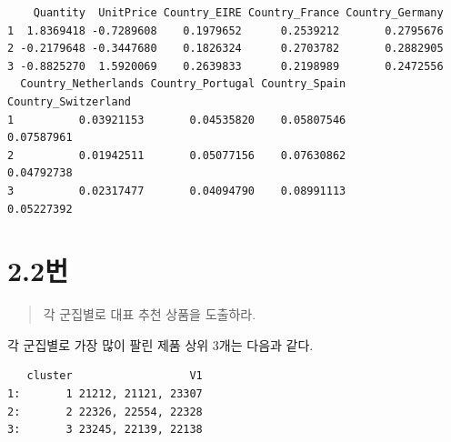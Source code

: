 \documentclass[
  letterpaper,
  DIV=11,
  numbers=noendperiod]{scrreprt}
\newenvironment{Shaded}{\begin{snugshade}}{\end{snugshade}}
\newcommand{\AttributeTok}[1]{\textcolor[rgb]{0.40,0.45,0.13}{#1}}
\newcommand{\DecValTok}[1]{\textcolor[rgb]{0.68,0.00,0.00}{#1}}
\newcommand{\FunctionTok}[1]{\textcolor[rgb]{0.28,0.35,0.67}{#1}}
\newcommand{\NormalTok}[1]{\textcolor[rgb]{0.00,0.23,0.31}{#1}}
\newcommand{\OtherTok}[1]{\textcolor[rgb]{0.00,0.23,0.31}{#1}}
\newcommand{\SpecialCharTok}[1]{\textcolor[rgb]{0.37,0.37,0.37}{#1}}
\begin{document}
\begin{Shaded}
\end{Shaded}

\begin{verbatim}
    Quantity  UnitPrice Country_EIRE Country_France Country_Germany
1  1.8369418 -0.7289608    0.1979652      0.2539212       0.2795676
2 -0.2179648 -0.3447680    0.1826324      0.2703782       0.2882905
3 -0.8825270  1.5920069    0.2639833      0.2198989       0.2472556
  Country_Netherlands Country_Portugal Country_Spain Country_Switzerland
1          0.03921153       0.04535820    0.05807546          0.07587961
2          0.01942511       0.05077156    0.07630862          0.04792738
3          0.02317477       0.04094790    0.08991113          0.05227392
\end{verbatim}

\hypertarget{uxbc88-23}{%
\section*{2.2번}\label{uxbc88-23}}


\begin{quote}
각 군집별로 대표 추천 상품을 도출하라.
\end{quote}

각 군집별로 가장 많이 팔린 제품 상위 3개는 다음과 같다.

\begin{Shaded}
\end{Shaded}

\begin{verbatim}
   cluster                  V1
1:       1 21212, 21121, 23307
2:       2 22326, 22554, 22328
3:       3 23245, 22139, 22138
\end{verbatim}
\end{document}
